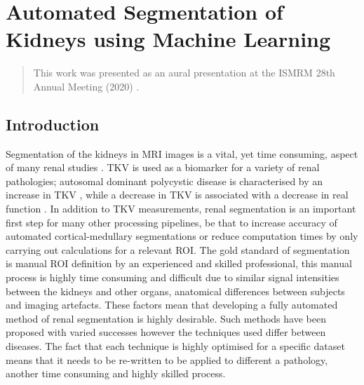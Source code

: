 \chapter{Automated Segmentation of Kidneys using Machine Learning}
\label{chap:ML}

\begin{abstract}
	This work was presented as an aural presentation at the \ac{ISMRM} 28th Annual Meeting (2020) \cite{daniel_automated_2020}.\\
	
	\lipsum[1]
\end{abstract}
\newpage

\section{Introduction}

Segmentation of the kidneys in \ac{MRI} images is a vital, yet time consuming, aspect of many renal studies \cite{cohen_mri_2009, van_den_dool_functional_2005, cox_multiparametric_2017}. \ac{TKV} is used as a biomarker for a variety of renal pathologies; autosomal dominant polycystic disease is characterised by an increase in \ac{TKV} \cite{chapman_kidney_2012, tangri_total_2017}, while a decrease in \ac{TKV} is associated with a decrease in real function \cite{gong_relationship_2012}. In addition to \ac{TKV} measurements, renal segmentation is an important first step for many other processing pipelines, be that to increase accuracy of automated cortical-medullary segmentations or reduce computation times by only carrying out calculations for a relevant \ac{ROI}. The gold standard of segmentation is manual \ac{ROI} definition by an experienced and skilled professional, this manual process is highly time consuming and difficult due to similar signal intensities between the kidneys and other organs, anatomical differences between subjects and imaging artefacts. These factors mean that developing a fully automated method of renal segmentation is highly desirable. Such methods have been proposed with varied successes \cite{zollner_assessment_2012, seuss_development_2017} however the techniques used differ between diseases. The fact that each technique is highly optimised for a specific dataset means that it needs to be re-written to be applied to different a pathology, another time consuming and highly skilled process.\\


